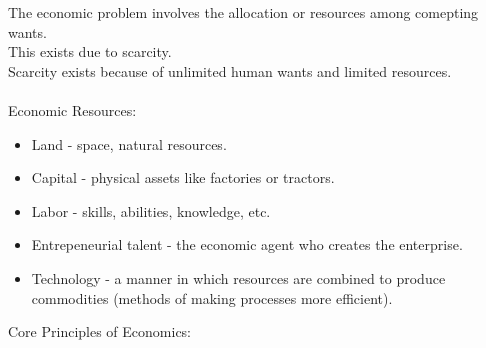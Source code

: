 \documentclass[nobib]{tufte-handout}
\begin{document}
\quad The economic problem involves the allocation or resources among comepting wants.\\
\quad This exists due to scarcity.\\
\quad Scarcity exists because of unlimited human wants and limited resources.\\~\\
Economic Resources:\\
\begin{itemize}
    \item Land - space, natural resources.
    \item Capital - physical assets like factories or tractors.
    \item Labor - skills, abilities, knowledge, etc.
    \item Entrepeneurial talent - the economic agent who creates the enterprise.
    \item Technology - a manner in which resources are combined to produce commodities
          (methods of making processes more efficient).
\end{itemize}
Core Principles of Economics:
\end{document}
